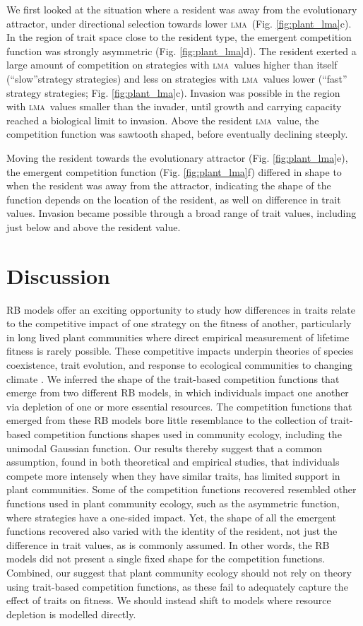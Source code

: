 \documentclass[a4paper,11pt]{article}
\newcommand{\lma}{\textsc{lma}}
\begin{document}
We first looked at the situation where a resident was away from the evolutionary attractor, under directional selection towards lower \lma\ (Fig. \ref{fig:plant_lma}c). In the region of trait space close to the resident type, the emergent competition function was strongly asymmetric (Fig. \ref{fig:plant_lma}d). The resident exerted a large amount of competition on strategies with \lma\ values higher than itself (``slow''strategy strategies) and less on strategies with \lma\ values lower (``fast'' strategy strategies; Fig. \ref{fig:plant_lma}c). Invasion was possible in the region with \lma\ values smaller than the invader, until growth and carrying capacity reached a biological limit to invasion. Above the resident \lma\ value, the competition function was sawtooth shaped, before eventually declining steeply.

Moving the resident towards the evolutionary attractor (Fig. \ref{fig:plant_lma}e), the emergent competition function (Fig. \ref{fig:plant_lma}f) differed in shape to when the resident was away from the attractor, indicating the shape of the function depends on the location of the resident, as well on difference in trait values. Invasion became possible through a broad range of trait values, including just below and above the resident value. 

\section{Discussion}

RB models offer an exciting opportunity to study how differences in traits relate to the competitive impact of one strategy on the fitness of another, particularly in long lived plant communities where direct empirical measurement of lifetime fitness is rarely possible. These competitive impacts underpin theories of species coexistence, trait evolution, and response to ecological communities to changing climate \citep{ Laughlin-2020}. We inferred the shape of the trait-based competition functions that emerge from two different RB models, in which individuals impact one another via depletion of one or more essential resources. The competition functions that emerged from these RB models bore little resemblance to the collection of trait-based competition functions shapes used in community ecology, including the unimodal Gaussian function. Our results thereby suggest that a common assumption, found in both theoretical and empirical studies, that individuals compete more intensely when they have similar traits, has limited support in plant communities. Some of the competition functions recovered resembled other functions used in plant community ecology, such as the asymmetric function, where strategies have a one-sided impact. Yet, the shape of all the emergent functions recovered also varied with the identity of the resident, not just the difference in trait values, as is commonly assumed. In other words, the RB models did not present a single fixed shape for the competition functions. Combined, our suggest that plant community ecology should not rely on theory using trait-based competition functions, as these fail to adequately capture the effect of traits on fitness. We should instead shift to models where resource depletion is modelled directly. 
\end{document}
